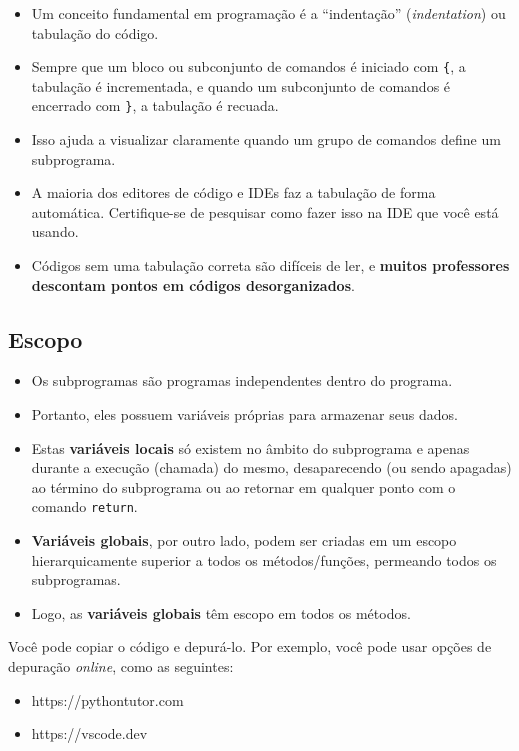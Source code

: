 \documentclass[12pt,a4paper]{article}
\providecommand{\tightlist}{%
      \setlength{\itemsep}{0pt}\setlength{\parskip}{0pt}}
\begin{document}
    \begin{itemize}
\item
  Um conceito fundamental em programação é a ``indentação''
  (\emph{indentation}) ou tabulação do código.
\item
  Sempre que um bloco ou subconjunto de comandos é iniciado com
  \texttt{\{}, a tabulação é incrementada, e quando um subconjunto de
  comandos é encerrado com \texttt{\}}, a tabulação é recuada.
\item
  Isso ajuda a visualizar claramente quando um grupo de comandos define
  um subprograma.
\item
  A maioria dos editores de código e IDEs faz a tabulação de forma
  automática. Certifique-se de pesquisar como fazer isso na IDE que você
  está usando.
\item
  Códigos sem uma tabulação correta são difíceis de ler, e
  \textbf{muitos professores descontam pontos em códigos
  desorganizados}.
\end{itemize}

    \hypertarget{escopo}{%
\subsection{Escopo}\label{escopo}}

    \begin{itemize}
\tightlist
\item
  Os subprogramas são programas independentes dentro do programa.
\item
  Portanto, eles possuem variáveis próprias para armazenar seus dados.
\item
  Estas \textbf{variáveis locais} só existem no âmbito do subprograma e
  apenas durante a execução (chamada) do mesmo, desaparecendo (ou sendo
  apagadas) ao término do subprograma ou ao retornar em qualquer ponto
  com o comando \texttt{return}.
\item
  \textbf{Variáveis globais}, por outro lado, podem ser criadas em um
  escopo hierarquicamente superior a todos os métodos/funções, permeando
  todos os subprogramas.
\item
  Logo, as \textbf{variáveis globais} têm escopo em todos os métodos.
\end{itemize}

    Você pode copiar o código e depurá-lo. Por exemplo, você pode usar
opções de depuração \emph{online}, como as seguintes:

\begin{itemize}
\tightlist
\item
  https://pythontutor.com
\item
  https://vscode.dev
\end{itemize}
\end{document}
